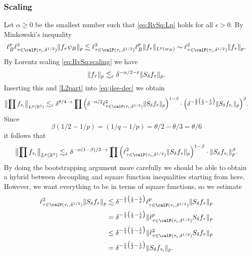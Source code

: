 \subsubsection{Scaling}
Let $\alpha \ge 0$ be the smallest number such that \eqref{eq:RvSq:Lp} holds for all $\epsilon>0$.
By Minkowski's inequality
\[
\ell^{p}_{B} \ell^{2}_{\tau \in \Part[\tau_i]{\delta^{1/2}}} \norm{f_{\tau} \psi_{B}}_{p}
\lesssim
\ell^{2}_{\tau \in \Part[\tau_i]{\delta^{1/2}}} \ell^{p}_{B} \norm{f_{\tau}}_{L^{p}(w_{B})}
\sim
\ell^{2}_{\tau \in \Part[\tau_i]{\delta^{1/2}}} \norm{f_{\tau}}_{p}.
\]
By Lorentz scaling \eqref{eq:RvSq:scaling} we have
\[
\lVert f_{\tau} \rVert_p
\lesssim_\varepsilon
\delta^{-\alpha/2 - \varepsilon} \lVert S_\delta f_{\tau} \rVert_p.
\]
Inserting this and \eqref{L2part} into \eqref{eq:jlee-dec} we obtain
\[
\norm[\big]{ \avprod f_{\tau_i} }_{L^{p}(\R^{3})}
\lesssim_\epsilon
\delta^{\theta/4-\epsilon} \avprod \Big( \delta^{-\alpha/2} \ell^{2}_{\tau \in \Part[\tau_i]{\delta^{1/2}}} \norm{ S_\delta f_{\tau} }_p \Big)^{1-\beta}\\
\cdot \Big( \delta^{-\frac{3}{2} \bigl( \frac{1}{2} - \frac{1}{p} \bigr)} \norm{ S_\delta f_{\tau_i} }_p \Big)^{\beta}.
\]
Since
\[
\beta(1/2-1/p)=(1/q-1/p)=\theta/2-\theta/3=\theta/6
\]
it follows that
\[
\norm[\big]{ \avprod f_{\tau_i} }_{L^{p}(\R^{3})}
\lesssim_\epsilon
\delta^{-\alpha(1-\beta)/2-\epsilon} \avprod \Big( \ell^{2}_{\tau \in \Part[\tau_i]{\delta^{1/2}}} \norm{ S_\delta f_{\tau} }_p \Big)^{1-\beta}\\
\cdot \norm{ S_\delta f_{\tau_i} }_p^{\beta}.
\]
By doing the bootstrapping argument more carefully we should be able to obtain a hybrid between decoupling and square function inequalities starting from here.
However, we want everything to be in terms of square functions, so we estimate
\begin{align*}
\ell^{2}_{\tau \in \Part[\tau_i]{\delta^{1/2}}} \norm{ S_\delta f_{\tau} }_p
&\lesssim
\delta^{-\frac{1}{4} \big( \frac{1}{2} - \frac{1}{p} \big)}
\ell^{p}_{\tau \in \Part[\tau_i]{\delta^{1/2}}} \norm{ S_\delta f_{\tau} }_p\\
&=
\delta^{-\frac{1}{4} \big( \frac{1}{2} - \frac{1}{p} \big)}
\norm{ \ell^{p}_{\tau \in \Part[\tau_i]{\delta^{1/2}}} S_\delta f_{\tau} }_p\\
&\leq
\delta^{-\frac{1}{4} \big( \frac{1}{2} - \frac{1}{p} \big)}
\norm{ \ell^{2}_{\tau \in \Part[\tau_i]{\delta^{1/2}}} S_\delta f_{\tau} }_p\\
&=
\delta^{-\frac{1}{4} \big( \frac{1}{2} - \frac{1}{p} \big)}
\norm{ S_\delta f_{\tau_i} }_p.
\end{align*}

